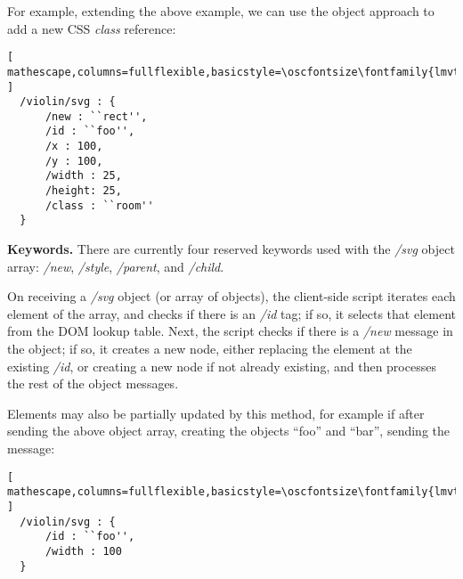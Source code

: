 For example, extending the above example, we can use the object approach to add a new CSS \textit{class} reference:

\begin{minipage}{\linewidth}
\begin{lstlisting}[ mathescape,columns=fullflexible,basicstyle=\oscfontsize\fontfamily{lmvtt}\selectfont ]
  /violin/svg : {
      /new : ``rect'',
      /id : ``foo'',
      /x : 100,
      /y : 100,
      /width : 25,
      /height: 25,
      /class : ``room''
  }
\end{lstlisting}
\end{minipage}


\medskip
\noindent
\textbf{Keywords.} 
There are currently four reserved keywords used with the \textit{/svg} object array: \textit{/new}, \textit{/style}, \textit{/parent}, and \textit{/child}.

On receiving a \textit{/svg} object (or array of objects), the client-side script iterates each element of the array, and checks if there is an \textit{/id} tag; if so, it selects that element from the DOM lookup table.
Next, the script checks if there is a \textit{/new} message in the object; if so, it creates a new node, either replacing the element at the existing \textit{/id}, or creating a new node if not already existing, and then processes the rest of the object messages.

Elements may also be partially updated by this method, for example if after sending the above object array, creating the objects ``foo'' and ``bar'', sending the message:

\begin{minipage}{\linewidth}
\begin{lstlisting}[ mathescape,columns=fullflexible,basicstyle=\oscfontsize\fontfamily{lmvtt}\selectfont ]
  /violin/svg : {
      /id : ``foo'',
      /width : 100
  }
  \end{lstlisting}
\end{minipage}


